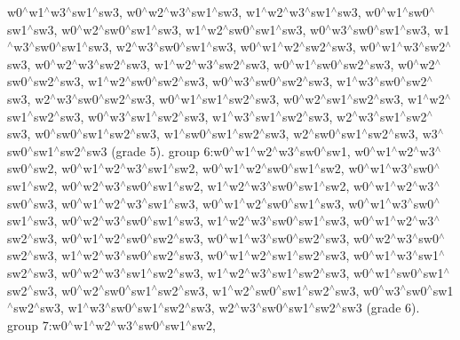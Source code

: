 w0$^\wedge$w1$^\wedge$w3$^\wedge$sw1$^\wedge$sw3, w0$^\wedge$w2$^\wedge$w3$^\wedge$sw1$^\wedge$sw3, w1$^\wedge$w2$^\wedge$w3$^\wedge$sw1$^\wedge$sw3, w0$^\wedge$w1$^\wedge$sw0$^\wedge$sw1$^\wedge$sw3, w0$^\wedge$w2$^\wedge$sw0$^\wedge$sw1$^\wedge$sw3, w1$^\wedge$w2$^\wedge$sw0$^\wedge$sw1$^\wedge$sw3, w0$^\wedge$w3$^\wedge$sw0$^\wedge$sw1$^\wedge$sw3, w1$^\wedge$w3$^\wedge$sw0$^\wedge$sw1$^\wedge$sw3, w2$^\wedge$w3$^\wedge$sw0$^\wedge$sw1$^\wedge$sw3, w0$^\wedge$w1$^\wedge$w2$^\wedge$sw2$^\wedge$sw3, w0$^\wedge$w1$^\wedge$w3$^\wedge$sw2$^\wedge$sw3, w0$^\wedge$w2$^\wedge$w3$^\wedge$sw2$^\wedge$sw3, w1$^\wedge$w2$^\wedge$w3$^\wedge$sw2$^\wedge$sw3, w0$^\wedge$w1$^\wedge$sw0$^\wedge$sw2$^\wedge$sw3, w0$^\wedge$w2$^\wedge$sw0$^\wedge$sw2$^\wedge$sw3, w1$^\wedge$w2$^\wedge$sw0$^\wedge$sw2$^\wedge$sw3, w0$^\wedge$w3$^\wedge$sw0$^\wedge$sw2$^\wedge$sw3, w1$^\wedge$w3$^\wedge$sw0$^\wedge$sw2$^\wedge$sw3, w2$^\wedge$w3$^\wedge$sw0$^\wedge$sw2$^\wedge$sw3, w0$^\wedge$w1$^\wedge$sw1$^\wedge$sw2$^\wedge$sw3, w0$^\wedge$w2$^\wedge$sw1$^\wedge$sw2$^\wedge$sw3, w1$^\wedge$w2$^\wedge$sw1$^\wedge$sw2$^\wedge$sw3, w0$^\wedge$w3$^\wedge$sw1$^\wedge$sw2$^\wedge$sw3, w1$^\wedge$w3$^\wedge$sw1$^\wedge$sw2$^\wedge$sw3, w2$^\wedge$w3$^\wedge$sw1$^\wedge$sw2$^\wedge$sw3, w0$^\wedge$sw0$^\wedge$sw1$^\wedge$sw2$^\wedge$sw3, w1$^\wedge$sw0$^\wedge$sw1$^\wedge$sw2$^\wedge$sw3, w2$^\wedge$sw0$^\wedge$sw1$^\wedge$sw2$^\wedge$sw3, w3$^\wedge$sw0$^\wedge$sw1$^\wedge$sw2$^\wedge$sw3 (grade 5). group 6\-:w0$^\wedge$w1$^\wedge$w2$^\wedge$w3$^\wedge$sw0$^\wedge$sw1, w0$^\wedge$w1$^\wedge$w2$^\wedge$w3$^\wedge$sw0$^\wedge$sw2, w0$^\wedge$w1$^\wedge$w2$^\wedge$w3$^\wedge$sw1$^\wedge$sw2, w0$^\wedge$w1$^\wedge$w2$^\wedge$sw0$^\wedge$sw1$^\wedge$sw2, w0$^\wedge$w1$^\wedge$w3$^\wedge$sw0$^\wedge$sw1$^\wedge$sw2, w0$^\wedge$w2$^\wedge$w3$^\wedge$sw0$^\wedge$sw1$^\wedge$sw2, w1$^\wedge$w2$^\wedge$w3$^\wedge$sw0$^\wedge$sw1$^\wedge$sw2, w0$^\wedge$w1$^\wedge$w2$^\wedge$w3$^\wedge$sw0$^\wedge$sw3, w0$^\wedge$w1$^\wedge$w2$^\wedge$w3$^\wedge$sw1$^\wedge$sw3, w0$^\wedge$w1$^\wedge$w2$^\wedge$sw0$^\wedge$sw1$^\wedge$sw3, w0$^\wedge$w1$^\wedge$w3$^\wedge$sw0$^\wedge$sw1$^\wedge$sw3, w0$^\wedge$w2$^\wedge$w3$^\wedge$sw0$^\wedge$sw1$^\wedge$sw3, w1$^\wedge$w2$^\wedge$w3$^\wedge$sw0$^\wedge$sw1$^\wedge$sw3, w0$^\wedge$w1$^\wedge$w2$^\wedge$w3$^\wedge$sw2$^\wedge$sw3, w0$^\wedge$w1$^\wedge$w2$^\wedge$sw0$^\wedge$sw2$^\wedge$sw3, w0$^\wedge$w1$^\wedge$w3$^\wedge$sw0$^\wedge$sw2$^\wedge$sw3, w0$^\wedge$w2$^\wedge$w3$^\wedge$sw0$^\wedge$sw2$^\wedge$sw3, w1$^\wedge$w2$^\wedge$w3$^\wedge$sw0$^\wedge$sw2$^\wedge$sw3, w0$^\wedge$w1$^\wedge$w2$^\wedge$sw1$^\wedge$sw2$^\wedge$sw3, w0$^\wedge$w1$^\wedge$w3$^\wedge$sw1$^\wedge$sw2$^\wedge$sw3, w0$^\wedge$w2$^\wedge$w3$^\wedge$sw1$^\wedge$sw2$^\wedge$sw3, w1$^\wedge$w2$^\wedge$w3$^\wedge$sw1$^\wedge$sw2$^\wedge$sw3, w0$^\wedge$w1$^\wedge$sw0$^\wedge$sw1$^\wedge$sw2$^\wedge$sw3, w0$^\wedge$w2$^\wedge$sw0$^\wedge$sw1$^\wedge$sw2$^\wedge$sw3, w1$^\wedge$w2$^\wedge$sw0$^\wedge$sw1$^\wedge$sw2$^\wedge$sw3, w0$^\wedge$w3$^\wedge$sw0$^\wedge$sw1$^\wedge$sw2$^\wedge$sw3, w1$^\wedge$w3$^\wedge$sw0$^\wedge$sw1$^\wedge$sw2$^\wedge$sw3, w2$^\wedge$w3$^\wedge$sw0$^\wedge$sw1$^\wedge$sw2$^\wedge$sw3 (grade 6). group 7\-:w0$^\wedge$w1$^\wedge$w2$^\wedge$w3$^\wedge$sw0$^\wedge$sw1$^\wedge$sw2, 